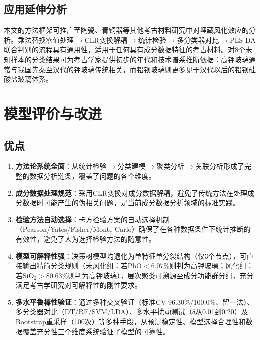 \documentclass[12pt,a4paper]{ctexart}
\begin{document}
\subsection{应用延伸分析}

本文的方法框架可推广至陶瓷、青铜器等其他考古材料研究中对埋藏风化效应的分析。乘法替换零值处理$\rightarrow$CLR变换解耦$\rightarrow$统计检验$\rightarrow$多分类器对比$\rightarrow$PLS-DA联合判别的流程具有通用性，适用于任何具有成分数据特征的考古材料。对8个未知样本的分类结果可为考古学家提供初步的年代和技术谱系推断依据：高钾玻璃通常与我国先秦至汉代的钾玻璃传统相关，而铅钡玻璃则更多见于汉代以后的铅钡硅酸盐玻璃体系。

\section{模型评价与改进}

\subsection{优点}

\begin{enumerate}[label=(\arabic*), leftmargin=*]
    \item \textbf{方法论系统全面}：从统计检验$\rightarrow$分类建模$\rightarrow$聚类分析$\rightarrow$关联分析形成了完整的数据分析链条，覆盖了问题的各个维度。
    \item \textbf{成分数据处理规范}：采用CLR变换对成分数据解耦，避免了传统方法在处理成分数据时可能产生的伪相关问题，是当前成分数据分析领域的标准实践。
    \item \textbf{检验方法自动选择}：卡方检验方案的自动选择机制（Pearson/Yates/Fisher/Monte Carlo）确保了在各种数据条件下统计推断的有效性，避免了人为选择检验方法的随意性。
    \item \textbf{模型可解释性强}：决策树模型均退化为单特征单分裂结构（仅3个节点），可直接输出精简分类规则（未风化组：若PbO$<6.07\%$则判为高钾玻璃；风化组：若SiO$_2>80.63\%$则判为高钾玻璃），层次聚类可溯源至成分功能群分组，充分满足考古学研究对可解释性的刚性要求。
    \item \textbf{多水平鲁棒性验证}：通过多种交叉验证（标准CV 96.30\%/100.0\%、留一法）、多分类器对比（DT/RF/SVM/LDA）、多水平扰动测试（$\delta$从0.01到0.20）及Bootstrap重采样（100次）等多种手段，从预测稳定性、模型选择合理性和数据覆盖充分性三个维度系统验证了模型的可靠性。
\end{enumerate}
\end{document}
